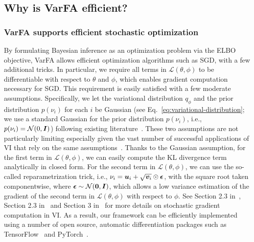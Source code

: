 \subsection{Why is VarFA efficient?}
\label{sec:implementation-detail}
\subsubsection*{VarFA supports efficient stochastic optimization}
By formulating Bayesian inference as an optimization problem via the ELBO
objective, VarFA allows efficient optimization algorithms such as SGD, with a
few additional tricks. In particular, we require all terms in
$\mathcal{L}(\theta,\phi)$ to be differentiable with respect to $\theta$ and
$\phi$, which enables gradient computation necessary for SGD. This requirement is
easily satisfied with a few moderate assumptions. Specifically, we let the
variational distribution $q_\phi$ and the prior distribution $p(\nu_i)$ for
each $i$ be Gaussian (see Eq.~\ref{eq:variational-distribution}; we use a
standard Gaussian for the prior distribution $p(\nu_i)$, i.e., $p(\nu_i) =
    \mathcal{N}(0, {\bm{I}})$) following existing
literature~\cite{kingma2013auto,rezende2014stochastic}. These two assumptions
are not particularly limiting especially given the vast number of successful
applications of VI that rely on the same
assumptions~\cite{infovae,dd,siddharth2017learning,fairvae,betatcvae,betavae,factorvae}.
%
Thanks to the Gaussian assumption, for the first term in
$\mathcal{L}(\theta,\phi)$, we can easily compute the KL divergence term
analytically in closed form. For the second term in $\mathcal{L}(\theta,\phi)$,
we can use the so-called reparametrization trick, i.e., $\nu_i = {\bm{u}}_i + \sqrt{{\bm{v}}_i}
    \odot \bm{\epsilon}$, with the square root taken componentwise, where $\bm{\epsilon}\sim\mathcal{N}(\bm{0}, {\bm{I}})$, which
allows a low variance estimation of the gradient of the second term in
$\mathcal{L}(\theta,\phi)$ with respect to $\phi$. See Section 2.3
in~\cite{kingma2013auto}, Section 2.3 in~\cite{kingma2019introduction} and
Section 3 in~\cite{rezende2014stochastic} for more details on stochastic
gradient computation in VI. As a result, our framework can be efficiently
implemented using a number of open source, automatic differentiation packages
such as TensorFlow~\cite{tensorflow2015-whitepaper} and
PyTorch~\cite{NEURIPS2019_9015}.
